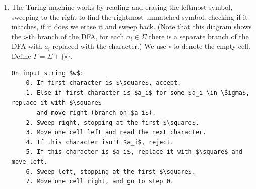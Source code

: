 \documentclass[12pt]{article}
\begin{document}
\begin{solution}
    \bbni
    \begin{enumerate}
        \item The Turing machine works by reading and erasing the leftmost symbol, sweeping to the right to find the rightmost unmatched symbol, checking if it matches, if it does we erase it and sweep back. (Note that this diagram shows the $i$-th branch of the DFA, for each $a_i \in \Sigma$ there is a separate branch of the DFA with $a_i$ replaced with the character.) We use $\square$ to denote the empty cell. Define $\Gamma = \Sigma + \{\square\}$. 
        \begin{center}
        \end{center}

        \newpage 
        \begin{lstlisting}[mathescape]
On input string $w$: 
    0. If first character is $\square$, accept. 
    1. Else if first character is $a_i$ for some $a_i \in \Sigma$, replace it with $\square$ 
       and move right (branch on $a_i$). 
    2. Sweep right, stopping at the first $\square$. 
    3. Move one cell left and read the next character. 
    4. If this character isn't $a_i$, reject. 
    5. If this character is $a_i$, replace it with $\square$ and move left. 
    6. Sweep left, stopping at the first $\square$.
    7. Move one cell right, and go to step 0. 
        \end{lstlisting}
    


\end{enumerate}
\end{solution}
\end{document}
